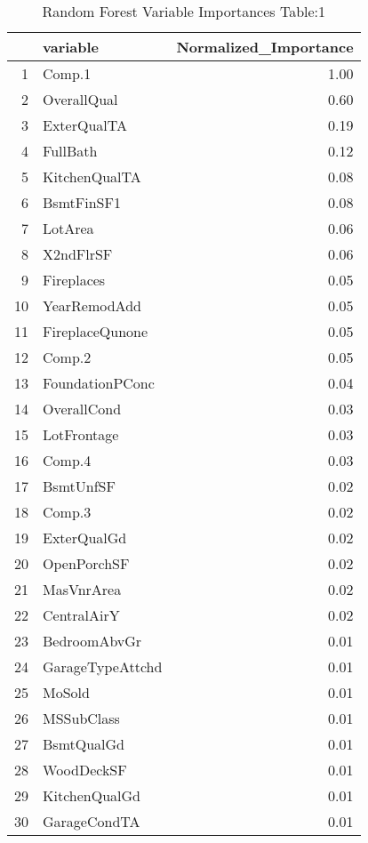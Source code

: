 \begin{table}[ht]
\centering
\begin{tabular}{rlr}
  \hline
 & variable & Normalized\_Importance \\ 
  \hline
1 & Comp.1 & 1.00 \\ 
  2 & OverallQual & 0.60 \\ 
  3 & ExterQualTA & 0.19 \\ 
  4 & FullBath & 0.12 \\ 
  5 & KitchenQualTA & 0.08 \\ 
  6 & BsmtFinSF1 & 0.08 \\ 
  7 & LotArea & 0.06 \\ 
  8 & X2ndFlrSF & 0.06 \\ 
  9 & Fireplaces & 0.05 \\ 
  10 & YearRemodAdd & 0.05 \\ 
  11 & FireplaceQunone & 0.05 \\ 
  12 & Comp.2 & 0.05 \\ 
  13 & FoundationPConc & 0.04 \\ 
  14 & OverallCond & 0.03 \\ 
  15 & LotFrontage & 0.03 \\ 
  16 & Comp.4 & 0.03 \\ 
  17 & BsmtUnfSF & 0.02 \\ 
  18 & Comp.3 & 0.02 \\ 
  19 & ExterQualGd & 0.02 \\ 
  20 & OpenPorchSF & 0.02 \\ 
  21 & MasVnrArea & 0.02 \\ 
  22 & CentralAirY & 0.02 \\ 
  23 & BedroomAbvGr & 0.01 \\ 
  24 & GarageTypeAttchd & 0.01 \\ 
  25 & MoSold & 0.01 \\ 
  26 & MSSubClass & 0.01 \\ 
  27 & BsmtQualGd & 0.01 \\ 
  28 & WoodDeckSF & 0.01 \\ 
  29 & KitchenQualGd & 0.01 \\ 
  30 & GarageCondTA & 0.01 \\ 
   \hline
\end{tabular}
\caption{Random Forest Variable Importances Table:1} 
\label{tab:importance1}
\end{table}

